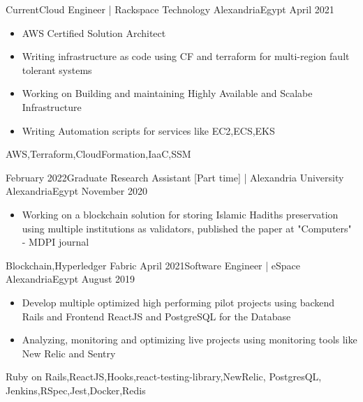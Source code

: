 \begin{experiences}
  \experience
    {Current}{Cloud Engineer | Rackspace Technology }{Alexandria}{Egypt}
    {April 2021}   {
                      \begin{itemize}
                        \item AWS Certified Solution Architect 
                        \item Writing infrastructure as code using CF and terraform for multi-region fault tolerant systems
                        \item Working on Building and maintaining Highly Available and Scalabe Infrastructure 
                        \item Writing Automation scripts for services like EC2,ECS,EKS
                      \end{itemize}
                    }
                {AWS,Terraform,CloudFormation,IaaC,SSM} 
 \emptySeparator

  \experience
    {February 2022}{Graduate Research Assistant [Part time] | Alexandria University }{Alexandria}{Egypt}
    {November 2020}   {
                      \begin{itemize}
                        \item  Working on a blockchain solution for storing Islamic Hadiths preservation using multiple institutions as validators, published the paper at "Computers" - MDPI journal
                      \end{itemize}
                    }
                {Blockchain,Hyperledger Fabric} 
 \emptySeparator
  \experience
    {April 2021}{Software Engineer | eSpace }{Alexandria}{Egypt}
    {August 2019}   {
                      \begin{itemize}
                        \item  Develop multiple optimized high performing  pilot projects using backend Rails and Frontend ReactJS and PostgreSQL for the Database
                        \item Analyzing, monitoring and optimizing live projects using monitoring tools like New Relic and Sentry
                      \end{itemize}
                    }
                    {Ruby on Rails,ReactJS,Hooks,react-testing-library,NewRelic, PostgresQL, Jenkins,RSpec,Jest,Docker,Redis}                    
\end{experiences}
